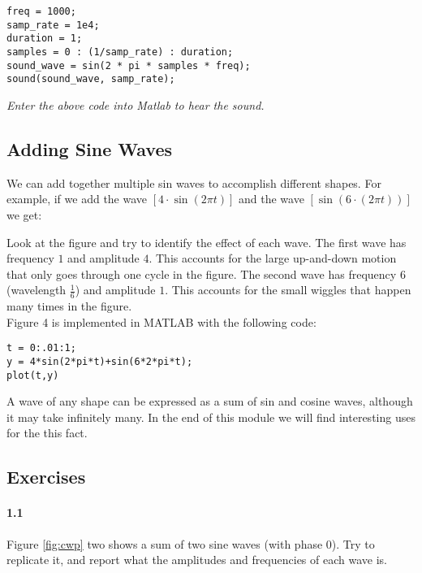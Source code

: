 \documentclass{article}
\begin{document}
\begin{verbatim}
freq = 1000;                
samp_rate = 1e4;
duration = 1;
samples = 0 : (1/samp_rate) : duration;
sound_wave = sin(2 * pi * samples * freq);
sound(sound_wave, samp_rate);
\end{verbatim}
{\it Enter the above code into Matlab to hear the sound.}


\subsection{Adding Sine Waves}
We can add together multiple sin waves to accomplish different shapes.  For example, if we add the wave $[4\cdot \sin(2\pi t)]$ and the wave  $[\sin(6\cdot(2\pi t))]$ we get:

Look at the figure and try to identify the effect of each wave.  The first wave has frequency $1$ and amplitude $4$.  This accounts for the large up-and-down motion that only goes through one cycle in the figure.  The second wave has frequency $6$ (wavelength $\frac{1}{6}$) and amplitude $1$.  This accounts for the small wiggles that happen many times in the figure.\\

Figure 4 is implemented in MATLAB with the following code:

\begin{verbatim}
t = 0:.01:1;
y = 4*sin(2*pi*t)+sin(6*2*pi*t);
plot(t,y)
\end{verbatim}
A wave of any shape can be expressed as a sum of sin and cosine waves, although it may take infinitely many.  In the end of this module we will find interesting uses for the this fact.

\subsection*{Exercises}
\paragraph{1.1} Figure \ref{fig:cwp} two shows a sum of two sine waves (with phase $0$).  Try to replicate it, and report what the amplitudes and frequencies of each wave is.
\end{document}
